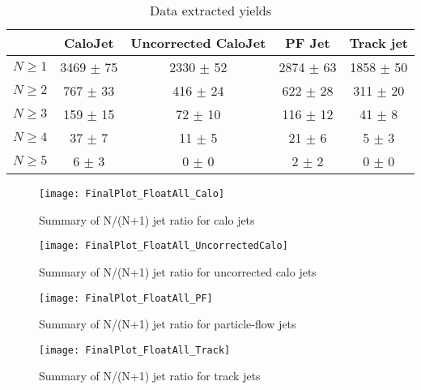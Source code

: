 \documentclass{cmspaper}
\begin{document}
\begin{table}
\caption{Data extracted yields}
\centering
   \begin{tabular}{|c|c|c|c|c|}
      \hline
      & CaloJet & Uncorrected CaloJet & PF Jet & Track jet \\\hline
      $N \ge 1$ & 3469 $\pm$ 75 & 2330 $\pm$ 52 & 2874 $\pm$ 63 & 1858 $\pm$ 50 \\\hline
      $N \ge 2$ & 767 $\pm$ 33 & 416 $\pm$ 24 & 622 $\pm$ 28 & 311 $\pm$ 20 \\\hline
      $N \ge 3$ & 159 $\pm$ 15 & 72 $\pm$ 10 & 116 $\pm$ 12 & 41 $\pm$ 8 \\\hline
      $N \ge 4$ & 37 $\pm$ 7 & 11 $\pm$ 5 & 21 $\pm$ 6 & 5 $\pm$ 3 \\\hline
      $N \ge 5$ & 6 $\pm$ 3 & 0 $\pm$ 0 & 2 $\pm$ 2 & 0 $\pm$ 0 \\\hline
   \end{tabular}
   \label{Table_DataExtractedYields}
\end{table}

\begin{figure}[hbtp]
   \begin{center} 
  \texttt{[image: FinalPlot\_FloatAll\_Calo]}
   \caption{Summary of N/(N+1) jet ratio for calo jets}
   \label{Figure_RatioFromDataCaloJet}
   \end{center}
\end{figure}

\begin{figure}[hbtp]
   \begin{center}
   \texttt{[image: FinalPlot\_FloatAll\_UncorrectedCalo]}
   \caption{Summary of N/(N+1) jet ratio for uncorrected calo jets}
   \label{Figure_RatioFromDataUncorrectedCaloJet}
   \end{center}
\end{figure}

\begin{figure}[hbtp]
   \begin{center}
   \texttt{[image: FinalPlot\_FloatAll\_PF]}
   \caption{Summary of N/(N+1) jet ratio for particle-flow jets}
   \label{Figure_RatioFromDataPFJet}
   \end{center}
\end{figure}

\begin{figure}[hbtp]
   \begin{center}
   \texttt{[image: FinalPlot\_FloatAll\_Track]}
   \caption{Summary of N/(N+1) jet ratio for track jets}
   \label{Figure_RatioFromDataTrackJet}
   \end{center}
\end{figure}
\end{document}
